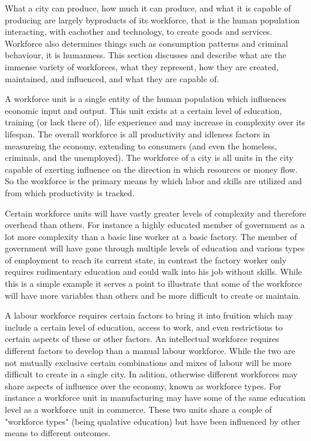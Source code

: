

What a city can produce, how much it can produce, and what it is capable of producing are largely byproducts of its workforce, that is the human population interacting, with eachother and technology, to create goods and services. Workforce also determines things such as consumption patterns and criminal behaviour, it is humanness. This section discusses and describe what are the immense variety of workforces, what they represent, how they are created, maintained, and influenced, and what they are capable of. 

A workforce unit is a single entity of the human population which influences economic input and output. This unit exists at a certain level of education, training (or lack there of), life experience and may increase in complexity over its lifespan. The overall workforce is all productivity and idleness factors in measureing the economy, extending to consumers (and even the homeless, criminals, and the unemployed). The workforce of a city is all units in the city capable of exerting influence on the direction in which resources or money flow. So the workforce is the primary means by which labor and skills are utilized and from which productivity is tracked.

Certain workforce units will have vastly greater levels of complexity and therefore overhead than others. For instance a highly educated member of government as a lot more complexity than a basic line worker at a basic factory. The member of government will have gone through multiple levels of education and various types of employment to reach its current state, in contrast the factory worker only requires rudimentary education and could walk into his job without skills. While this is a simple example it serves a point to illustrate that some of the workforce will have more variables than others and be more difficult to create or maintain.

A labour workforce requires certain factors to bring it into fruition which may include a certain level of education, access to work, and even restrictions to certain aspects of these or other factors. An intellectual workforce requires different factors to develop than a manual labour workforce. While the two are not mutually exclusive certain combinations and mixes of labour will be more difficult to create in a single city. In adition, otherwise different workforces may share aspects of influence over the economy, known as workforce types. For instance a workforce unit in manufacturing may have some of the same education level as a workforce unit in commerce. These two units share a couple of "workforce types" (being qualative education) but have been influenced by other means to different outcomes. 

